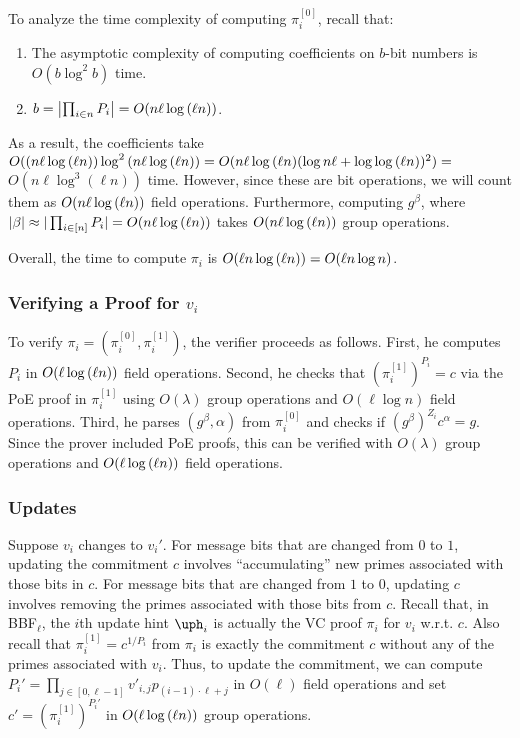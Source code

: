 To analyze the time complexity of computing $\pi_i^{[0]}$, recall that:
\begin{enumerate}
    \item The asymptotic complexity of computing \bezout coefficients on $b$-bit numbers is $O(b\log^2{b})$ time.
    \item $b=\left|\prod_{i\in n} P_i\right|=O(n\ell \log{(\ell n)})$.
\end{enumerate}
As a result, the \bezout coefficients take $O((n\ell\log{(\ell n)}) \log^2{(n \ell\log{(\ell n)})=O(n\ell\log{(\ell n)} (\log{n\ell} + \log{\ensuremath{\log{(\ell n)}}})^2)}={}$\linebreak[4]$O(n\ell\log^3(\ell n))$ time.
However, since these are bit operations, we will count them as $O(n\ell \log{(\ell n)})$ field operations.
Furthermore, computing $g^{\beta}$, where $|\beta|\approx|\prod_{i\in[n]}P_i|=O(n\ell\log{(\ell n)})$ takes $O(n\ell\log{(\ell n)})$ group operations.

Overall, the time to compute $\pi_i$ is $O(\ell n\log{(\ell n)})=O(\ell n\log{n})$.

\subsubsection{Verifying a Proof for $v_i$}
\label{s:complexity-bbf:verify-one-proof}

To verify $\pi_i = (\pi_{i}^{[0]}, \pi_i^{[1]})$, the verifier proceeds as follows.
First, he computes $P_i$ in $O(\ell\log{(\ell n)})$ field operations.
Second, he checks that $\left(\pi_i^{[1]}\right)^{P_i} = c$ via the PoE proof in $\pi_i^{[1]}$ using $O(\lambda)$ group operations and $O(\ell\log{n})$ field operations.
Third, he parses $(g^{\beta}, \alpha)$ from $\pi_i^{[0]}$ and checks if $(g^{\beta})^{Z_i} c^\alpha=g$.
Since the prover included PoE proofs, this can be verified with $O(\lambda)$ group operations and $O(\ell\log{(\ell n)})$ field operations.

\subsubsection{Updates}
\label{s:complexity-bbf:proof-updates}

Suppose $v_i$ changes to $v_i'$.
For message bits that are changed from $0$ to $1$, updating the commitment $c$ involves ``accumulating'' new primes associated with those bits in $c$.
For message bits that are changed from $1$ to $0$, updating $c$ involves removing the primes associated with those bits from $c$.
Recall that, in BBF$_\ell$, the $i$th update hint $\uph_i$ is actually the VC proof $\pi_i$ for $v_i$ w.r.t. $c$.
Also recall that $\pi_i^{[1]}=c^{1/P_i}$ from $\pi_i$ is exactly the commitment $c$ without any of the primes associated with $v_i$.
Thus, to update the commitment, we can compute $P_i'=\prod_{j\in [0,\ell-1]} v'_{i,j} p_{(i-1)\cdot\ell + j}$ in $O(\ell)$ field operations and set $c' = \left(\pi_i^{[1]}\right)^{P_i'}$ in $O(\ell \log{(\ell n)})$ group operations.

